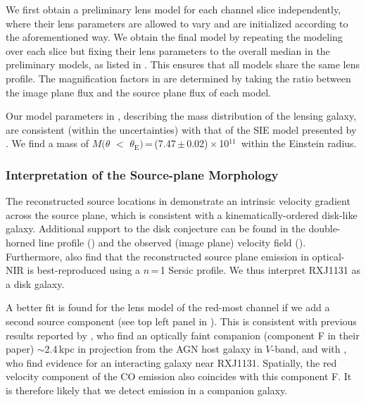 \documentclass[]{emulateapj}
\begin{document}
We first obtain a preliminary lens model for each channel slice independently,
where their lens parameters are allowed to vary and are initialized according
to the aforementioned way. We obtain the final model
by repeating the modeling over each slice but fixing their lens parameters
to the overall median in the preliminary models,
as listed in .
This ensures that all models share the same lens profile.
The magnification factors in  are determined by taking the ratio
between the image plane flux and the source plane flux of each model.

Our model parameters in , describing
the mass distribution of the lensing galaxy, are consistent (within the uncertainties)
with that of the SIE model presented by . We find a mass of
$M(\theta$\,\,$<$\,\,$\theta_\textrm{E})$\,=\,(7.47\,$\pm$\,0.02)\,$\times$\,10$^{11}$\,\Msun
within the Einstein radius.

\subsubsection{Interpretation of the Source-plane Morphology} \label{sec:caveat}
The reconstructed source locations in  demonstrate
an intrinsic velocity gradient across the source plane, which is
consistent with a kinematically-ordered disk-like galaxy.
Additional support to the disk conjecture
can be found in the double-horned line profile ()
and the observed (image plane) velocity field (). Furthermore,
 also find that the reconstructed source plane emission in optical-NIR
is best-reproduced using a $n$\,=\,1 Sersic profile.
We thus interpret RXJ1131 as a disk galaxy.

A better fit is found for the lens model of
the red-most channel if we add a second source component (see
top left panel in ). This is consistent with previous results
reported by \citet[hereafter B08]{Brewer08a}, who find an optically faint companion
(component F in their paper) $\sim$2.4\,kpc in projection from the AGN host galaxy in $V$-band,
and with , who find evidence for an interacting galaxy near RXJ1131.
Spatially, the red velocity component of the CO emission
also coincides with this component F. It is therefore likely that we
detect \bco emission in a companion galaxy.
\end{document}
